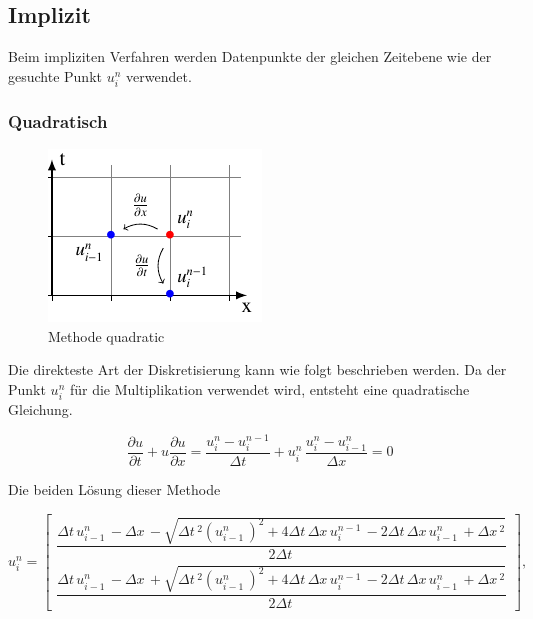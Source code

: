 	
\subsection{Implizit}

	Beim impliziten Verfahren werden Datenpunkte der gleichen Zeitebene wie der gesuchte Punkt $u_{i}^{n}$ verwendet.
	

\subsubsection{Quadratisch}
     \begin{figure}
	\centering
	\includegraphics[height=.4\textwidth]{papers/burgers/BurgersEquation/tikz/quadratic/quadratic.pdf}
	\caption{Methode quadratic}
	\label{burgers:fig:quadratic}
	\end{figure}

	Die direkteste Art der Diskretisierung kann wie folgt beschrieben werden.
	Da der Punkt $u_{i}^{n}$ f\"ur die Multiplikation verwendet wird, entsteht eine quadratische Gleichung.


\begin{equation}
\frac {\partial u}{\partial t}+u{\frac {\partial u}{\partial x}} = \frac{u_{i}^{n}-u_{i}^{n-1}}{\Delta t}+ u_{i}^{n}\, \frac{u_{i}^{n}-u_{i-1}^{n}}{\Delta x}=0
\end{equation}

	Die beiden L\"osung dieser Methode

\begin{equation}
  u_{i}^{n} = \begin{bmatrix}
     \dfrac{\Delta{t}\, u^{n}_{i-1}\, - \Delta{x}\, - \sqrt{\Delta{t}\,^{2} \left(u^{n}_{i-1}\,\right)^{2} + 4 \Delta{t}\, \Delta{x}\, u^{n-1}_{i}\, - 2 \Delta{t}\, \Delta{x}\, u^{n}_{i-1}\, + \Delta{x}\,^{2}}}{2 \Delta{t}\,} \\[15pt]
     \dfrac{\Delta{t}\, u^{n}_{i-1}\, - \Delta{x}\, + \sqrt{\Delta{t}\,^{2} \left(u^{n}_{i-1}\,\right)^{2} + 4 \Delta{t}\, \Delta{x}\, u^{n-1}_{i}\, - 2 \Delta{t}\, \Delta{x}\, u^{n}_{i-1}\, + \Delta{x}\,^{2}}}{2 \Delta{t}\,}
  \end{bmatrix},
\end{equation}

